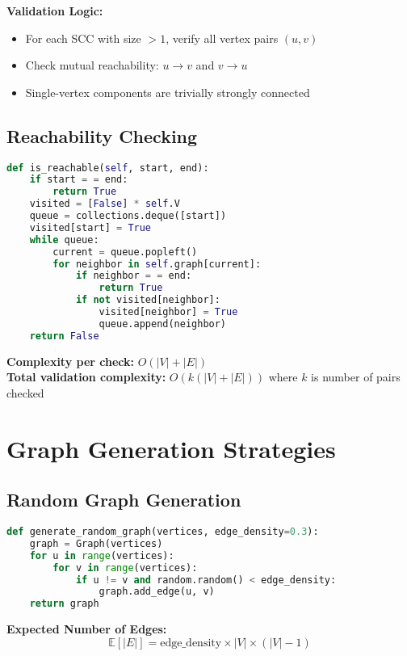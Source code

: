 \documentclass{book}
\theoremstyle{definition}
\begin{document}
\textbf{Validation Logic:}
\begin{itemize}
    \item For each SCC with size $> 1$, verify all vertex pairs $(u,v)$
    \item Check mutual reachability: $u \to  v$ and $v \to  u$
    \item Single-vertex components are trivially strongly connected
\end{itemize}

\subsection{Reachability Checking}

\begin{lstlisting}[language=Python]
def is_reachable(self, start, end):
    if start = = end:
        return True
    visited = [False] * self.V
    queue = collections.deque([start])
    visited[start] = True
    while queue:
        current = queue.popleft()
        for neighbor in self.graph[current]:
            if neighbor = = end:
                return True
            if not visited[neighbor]:
                visited[neighbor] = True
                queue.append(neighbor)
    return False
\end{lstlisting}

\textbf{Complexity per check:} $O(|V| + |E|)$ \\
\textbf{Total validation complexity:} $O(k (|V| + |E|))$ where $k$ is number of pairs checked

\section{Graph Generation Strategies}

\subsection{Random Graph Generation}

\begin{lstlisting}[language=Python]
def generate_random_graph(vertices, edge_density=0.3):
    graph = Graph(vertices)
    for u in range(vertices):
        for v in range(vertices):
            if u != v and random.random() < edge_density:
                graph.add_edge(u, v)
    return graph
\end{lstlisting}

\textbf{Expected Number of Edges:}
\begin{equation}
\mathbb{E}[|E|] = \text{edge\_density} \times |V| \times (|V| - 1)
\end{equation}
\end{document}
